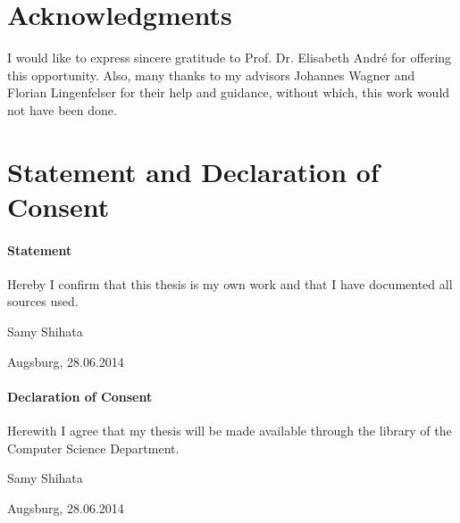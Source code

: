 \documentclass[12pt, a4paper, fleqn]{memoir}%
\begin{document}

\chapter*{Acknowledgments}
I would like to express sincere gratitude to Prof. Dr. Elisabeth Andr\'{e} for offering this opportunity. Also, many thanks to my advisors Johannes Wagner and Florian Lingenfelser for their help and guidance, without which, this work would not have been done.

\chapter*{Statement and Declaration of Consent}
\vfill
\subsubsection*{\LARGE Statement}
Hereby I confirm that this thesis is my own work and that I have documented all sources used.
\vfill
\begin{flushleft}
Samy Shihata
\end{flushleft}  
\begin{flushright}
Augsburg, 28.06.2014 
\end{flushright}
\vfill
\vfill
\subsubsection*{\LARGE Declaration of Consent}
Herewith I agree that my thesis will be made available through the library of the Computer Science Department.
\vfill
\begin{flushleft}
Samy Shihata
\end{flushleft}  
\begin{flushright}
Augsburg, 28.06.2014 
\end{flushright}
\vfill
\end{document}
